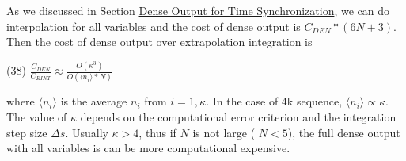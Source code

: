 As we discussed in Section \hyperlink{index_dense_sec}{Dense Output for Time Synchronization}, we can do interpolation for all variables and the cost of dense output is $ C_{DEN}*(6N+3) $. Then the cost of dense output over extrapolation integration is

(38) $ \frac{C_{DEN}}{C_{EINT}} \approx \frac{O(\kappa^3)}{O(\langle n_i\rangle*N)} $

where $\langle n_i\rangle$ is the average $ n_i $ from $ i=1,\kappa$. In the case of 4k sequence, $\langle n_i\rangle \propto \kappa$. The value of $\kappa$ depends on the computational error criterion and the integration step size $ \Delta s$. Usually $ \kappa>4 $, thus if $ N $ is not large ( $ N < 5 $), the full dense output with all variables is can be more computational expensive. 